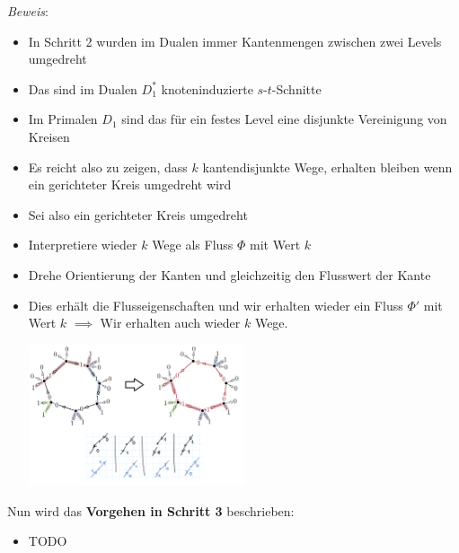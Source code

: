 \textit{Beweis}:
\begin{itemize}
	\item In Schritt 2 wurden im Dualen immer Kantenmengen zwischen zwei Levels umgedreht
	\item Das sind im Dualen $D_1^*$ knoteninduzierte $s$-$t$-Schnitte
	\item Im Primalen $D_1$ sind das für ein festes Level eine disjunkte Vereinigung von Kreisen
	\item Es reicht also zu zeigen, dass $k$ kantendisjunkte Wege, erhalten bleiben wenn ein gerichteter Kreis umgedreht wird
	\item Sei also ein gerichteter Kreis umgedreht
	\item Interpretiere wieder $k$ Wege als Fluss $\Phi$ mit Wert $k$
	\item Drehe Orientierung der Kanten und gleichzeitig den Flusswert der Kante
	\item Dies erhält die Flusseigenschaften und wir erhalten wieder ein Fluss $\Phi'$ mit Wert $k$ $\implies$ Wir erhalten auch wieder $k$ Wege.
	\begin{center}
		\includegraphics[width=0.5\textwidth]{images/menger-5.png}
	\end{center}
\end{itemize}
\bigskip
Nun wird das \textbf{Vorgehen in Schritt 3} beschrieben:
\begin{itemize}
	\item TODO
\end{itemize}